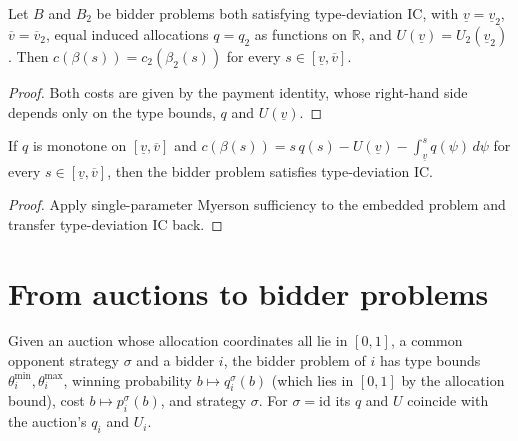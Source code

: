 \begin{theorem}\label{thm:MathEconLib.BidderProblem.payment_unique}\leanok
{}
Let $B$ and $B_2$ be bidder problems both satisfying type-deviation IC, with $\underline v=\underline v_2$, $\overline v=\overline v_2$, equal induced allocations $q=q_2$ as functions on $\mathbb{R}$, and $U(\underline v)=U_2(\underline v_2)$. Then $c(\beta(s))=c_2(\beta_2(s))$ for every $s\in[\underline v,\overline v]$.
\end{theorem}
\begin{proof}\leanok
{}
Both costs are given by the payment identity, whose right-hand side depends only on the type bounds, $q$ and $U(\underline v)$.
\end{proof}

\begin{theorem}\label{thm:MathEconLib.BidderProblem.typeDeviationIC_of_monotone_q}\leanok
{}
If $q$ is monotone on $[\underline v,\overline v]$ and $c(\beta(s))=s\,q(s)-U(\underline v)-\int_{\underline v}^{s}q(\psi)\,d\psi$ for every $s\in[\underline v,\overline v]$, then the bidder problem satisfies type-deviation IC.
\end{theorem}
\begin{proof}\leanok
{}
Apply single-parameter Myerson sufficiency to the embedded problem and transfer type-deviation IC back.
\end{proof}

\section{From auctions to bidder problems}

\begin{definition}\label{def:MathEconLib.Auction.toBidderProblem}\leanok
{}
Given an auction whose allocation coordinates all lie in $[0,1]$, a common opponent strategy $\sigma$ and a bidder $i$, the bidder problem of $i$ has type bounds $\theta^{\min}_i,\theta^{\max}_i$, winning probability $b\mapsto q^\sigma_i(b)$ (which lies in $[0,1]$ by the allocation bound), cost $b\mapsto p^\sigma_i(b)$, and strategy $\sigma$. For $\sigma=\mathrm{id}$ its $q$ and $U$ coincide with the auction's $q_i$ and $U_i$.
\end{definition}

